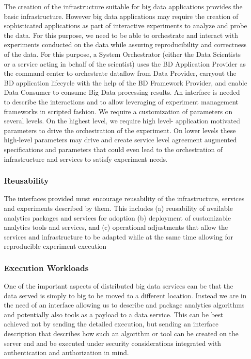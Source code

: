\documentclass[10pt]{article}
\begin{document}
The creation of the infrastructure suitable for big data applications
provides the basic infrastructure. However big data applications may
require the creation of sophisticated applications as part of
interactive experiments to analyze and probe the data. For this
purpose, we need to be able to orchestrate and interact with
experiments conducted on the data while assuring reproducibility and
correctness of the data. For this purpose, a System Orchestrator
(either the Data Scientists or a service acting in behalf of the
scientist) uses the BD Application Provider as the command center to
orchestrate dataflow from Data Provider, carryout the BD application
lifecycle with the help of the BD Framework Provider, and enable Data
Consumer to consume Big Data processing results. An interface is
needed to describe the interactions and to allow leveraging of
experiment management frameworks in scripted fashion. We require a
customization of parameters on several levels. On the highest level,
we require high level- application motivated parameters to drive the
orchestration of the experiment. On lower levels these high-level
parameters may drive and create service level agreement augmented
specifications and parameters that could even lead to the
orchestration of infrastructure and services to satisfy experiment
needs.

\subsubsection{Reusability}

The interfaces provided must encourage reusability of the
infrastructure, services and experiments described by them. This
includes (a) reusability of available analytics packages and services
for adoption (b) deployment of customizable analytics tools and
services, and (c) operational adjustments that allow the services and
infrastructure to be adapted while at the same time allowing for
reproducible experiment execution

\subsubsection{Execution Workloads}

One of the important aspects of distributed big data services can be
that the data served is simply to big to be moved to a different
location. Instead we are in the need of an interface allowing us to
describe and package analytics algorithms and potentially also tools
as a payload to a data service. This can be best achieved not by
sending the detailed execution, but sending an interface description
that describes how such an algorithm or tool can be created on the
server end and be executed under security considerations integrated
with authentication and authorization in mind.
\end{document}
